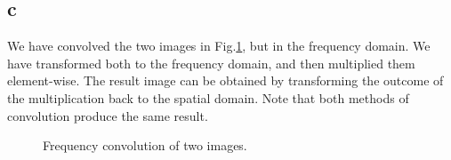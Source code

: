 \documentclass[11pt,a4paper]{article}
\begin{document}
\subsection{c}
We have convolved the two images in Fig.\ref{fig:a1c}, but in the frequency domain. We have transformed both to the frequency domain, and then multiplied them element-wise. The result image can be obtained by transforming the outcome of the multiplication back to the spatial domain. Note that both methods of convolution produce the same result.
\begin{figure}%
\centering
{}
\quad
{}
\quad
{}
\quad

\caption{Frequency convolution of two images.}%
\label{fig:a1c}%
\end{figure}

\FloatBarrier
\end{document}
